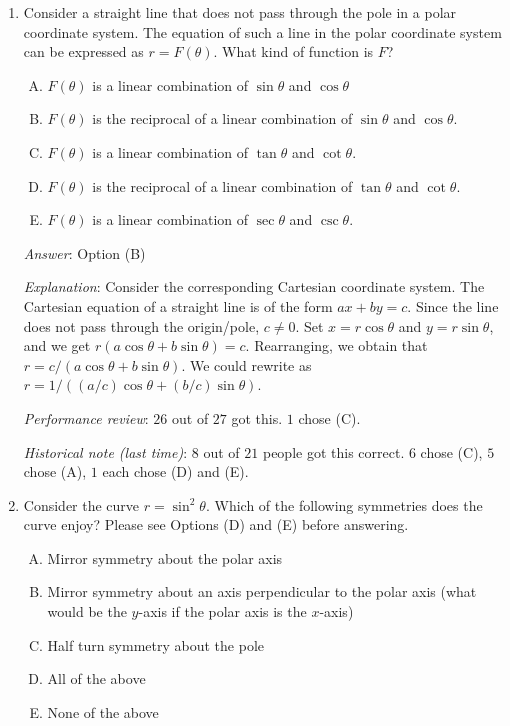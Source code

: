 \documentclass[10pt]{amsart}
\begin{document}
\begin{enumerate}

\item Consider a straight line that does not pass through the pole in
  a polar coordinate system. The equation of such a line in the polar
  coordinate system can be expressed as $r = F(\theta)$. What kind of
  function is $F$?

  \begin{enumerate}[(A)]

  \item $F(\theta)$ is a linear combination of $\sin \theta$ and $\cos \theta$
  \item $F(\theta)$ is the reciprocal of a linear combination of $\sin
    \theta$ and $\cos \theta$.
  \item $F(\theta)$ is a linear combination of $\tan \theta$ and $\cot
    \theta$.
  \item $F(\theta)$ is the reciprocal of a linear combination of $\tan
    \theta$ and $\cot \theta$.
  \item $F(\theta)$ is a linear combination of $\sec \theta$ and $\csc
    \theta$.
  \end{enumerate}

  {\em Answer}: Option (B)
  
  {\em Explanation}: Consider the corresponding Cartesian coordinate
  system. The Cartesian equation of a straight line is of the form $ax
  + by = c$. Since the line does not pass through the origin/pole, $c
  \ne 0$. Set $x = r \cos \theta$ and $y = r \sin \theta$, and we get
  $r(a \cos \theta + b \sin \theta) = c$. Rearranging, we obtain that
  $r = c/(a \cos \theta + b \sin \theta)$. We could rewrite as $r =
  1/((a/c)\cos \theta + (b/c)\sin \theta)$.

  {\em Performance review}: $26$ out of $27$ got this. $1$ chose (C).

  {\em Historical note (last time)}: $8$ out of $21$ people got this
  correct. $6$ chose (C), $5$ chose (A), $1$ each chose (D) and (E).
\item Consider the curve $r = \sin^2\theta$. Which of the following
  symmetries does the curve enjoy? Please see Options (D) and (E)
  before answering.

  \begin{enumerate}[(A)]
  \item Mirror symmetry about the polar axis
  \item Mirror symmetry about an axis perpendicular to the polar axis
    (what would be the $y$-axis if the polar axis is the $x$-axis)
  \item Half turn symmetry about the pole
  \item All of the above
  \item None of the above
  \end{enumerate}


\end{enumerate}
\end{document}
